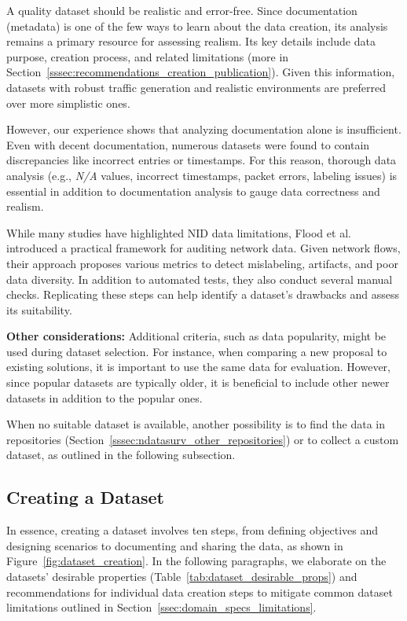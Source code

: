 A quality dataset should be realistic and error-free. Since documentation (metadata) is one of the few ways to learn about the data creation, its analysis remains a primary resource for assessing realism. Its key details include data purpose, creation process, and related limitations (more in Section~\ref{sssec:recommendations_creation_publication}). Given this information, datasets with robust traffic generation and realistic environments are preferred over more simplistic ones.

However, our experience shows that analyzing documentation alone is insufficient. Even with decent documentation, numerous datasets were found to contain discrepancies like incorrect entries or timestamps. For this reason, thorough data analysis (e.g., \emph{N/A} values, incorrect timestamps, packet errors, labeling issues) is essential in addition to documentation analysis to gauge data correctness and realism.

While many studies have highlighted NID data limitations, Flood et al.~\cite{flood2024_bad_design_smells_nids_datasets} introduced a practical framework for auditing network data. Given network flows, their approach proposes various metrics to detect mislabeling, artifacts, and poor data diversity. In addition to automated tests, they also conduct several manual checks. Replicating these steps can help identify a dataset's drawbacks and assess its suitability.

\textbf{Other considerations:} Additional criteria, such as data popularity, might be used during dataset selection. For instance, when comparing a new proposal to existing solutions, it is important to use the same data for evaluation. However, since popular datasets are typically older, it is beneficial to include other newer datasets in addition to the popular ones.

When no suitable dataset is available, another possibility is to find the data in repositories (Section~\ref{sssec:ndatasurv_other_repositories}) or to collect a custom dataset, as outlined in the following subsection.

\subsection{Creating a Dataset}
\label{ssec:recommendations_creation}

In essence, creating a dataset involves ten steps, from defining objectives and designing scenarios to documenting and sharing the data, as shown in Figure~\ref{fig:dataset_creation}. In the following paragraphs, we elaborate on the datasets' desirable properties (Table~\ref{tab:dataset_desirable_props}) and recommendations for individual data creation steps to mitigate common dataset limitations outlined in Section~\ref{ssec:domain_specs_limitations}.

